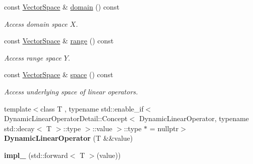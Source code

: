 \begin{DoxyCompactItemize}
\item 
\hypertarget{classSpacy_1_1DynamicLinearOperator_aa5882565e1a88f20a16f7e7a27df3015}{const \hyperlink{classSpacy_1_1VectorSpace}{\-Vector\-Space} \& \hyperlink{classSpacy_1_1DynamicLinearOperator_aa5882565e1a88f20a16f7e7a27df3015}{domain} () const }\label{classSpacy_1_1DynamicLinearOperator_aa5882565e1a88f20a16f7e7a27df3015}

\begin{DoxyCompactList}\small\item\em \-Access domain space $X$. \end{DoxyCompactList}\item 
\hypertarget{classSpacy_1_1DynamicLinearOperator_a08e5f8bd41f1112ae349e50dd773b9ea}{const \hyperlink{classSpacy_1_1VectorSpace}{\-Vector\-Space} \& \hyperlink{classSpacy_1_1DynamicLinearOperator_a08e5f8bd41f1112ae349e50dd773b9ea}{range} () const }\label{classSpacy_1_1DynamicLinearOperator_a08e5f8bd41f1112ae349e50dd773b9ea}

\begin{DoxyCompactList}\small\item\em \-Access range space $Y$. \end{DoxyCompactList}\item 
\hypertarget{classSpacy_1_1DynamicLinearOperator_afde64039ceab0ad8752bce3ac2187a41}{const \hyperlink{classSpacy_1_1VectorSpace}{\-Vector\-Space} \& \hyperlink{classSpacy_1_1DynamicLinearOperator_afde64039ceab0ad8752bce3ac2187a41}{space} () const }\label{classSpacy_1_1DynamicLinearOperator_afde64039ceab0ad8752bce3ac2187a41}

\begin{DoxyCompactList}\small\item\em \-Access underlying space of linear operators. \end{DoxyCompactList}\item 
\hypertarget{classSpacy_1_1DynamicLinearOperator_a3fb5b02bd4c03894dc502a936a9a3ec8}{{\footnotesize template$<$class T , typename std\-::enable\-\_\-if$<$ Dynamic\-Linear\-Operator\-Detail\-::\-Concept$<$ Dynamic\-Linear\-Operator, typename std\-::decay$<$ T $>$\-::type $>$\-::value $>$\-::type $\ast$  = nullptr$>$ }\\{\bfseries \-Dynamic\-Linear\-Operator} (\-T \&\&value)}\label{classSpacy_1_1DynamicLinearOperator_a3fb5b02bd4c03894dc502a936a9a3ec8}

\item 
\hypertarget{classSpacy_1_1DynamicLinearOperator_a63de0ecf02daa1697b452117cb1399f2}{{\bfseries impl\-\_\-} (std\-::forward$<$ \-T $>$(value))}\label{classSpacy_1_1DynamicLinearOperator_a63de0ecf02daa1697b452117cb1399f2}


\end{DoxyCompactItemize}

